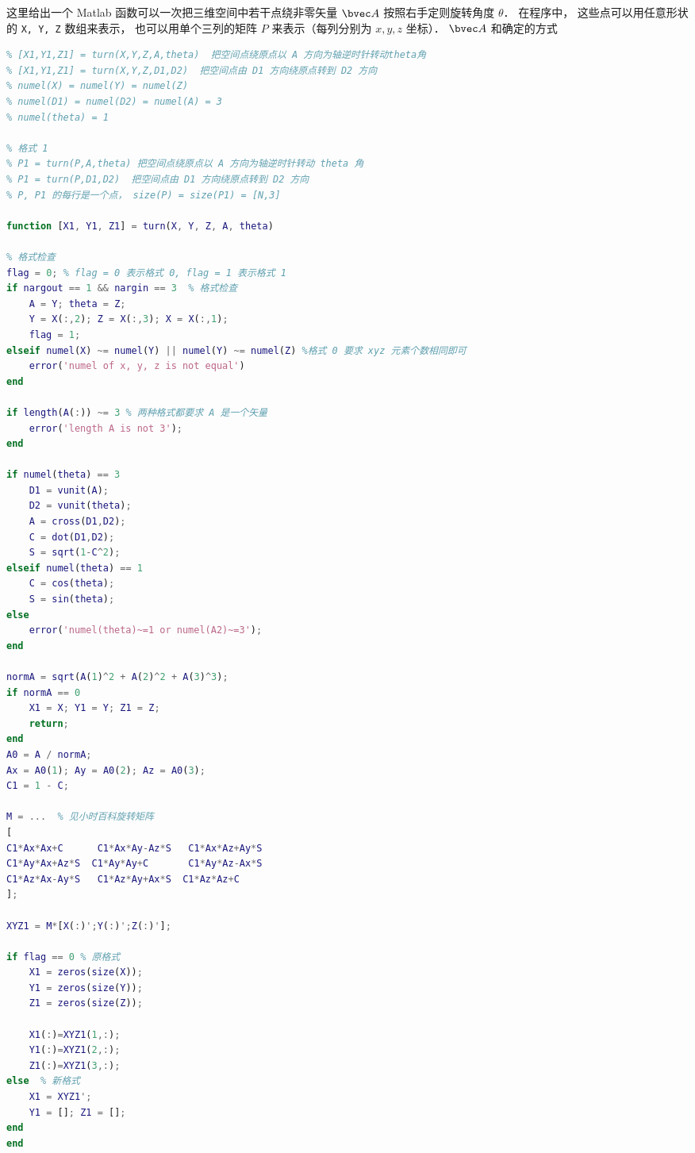 
\begin{issues}
\issueNeedCite
\end{issues}


这里给出一个 Matlab 函数可以一次把三维空间中若干点绕非零矢量 $\bvec A$ 按照右手定则旋转角度 $\theta$． 在程序中， 这些点可以用任意形状的 \verb|X, Y, Z| 数组来表示， 也可以用单个三列的矩阵 $P$ 来表示（每列分别为 $x, y, z$ 坐标）． $\bvec A$ 和确定的方式

\begin{lstlisting}[language=matlab]
% 格式 0
% [X1,Y1,Z1] = turn(X,Y,Z,A,theta)  把空间点绕原点以 A 方向为轴逆时针转动theta角
% [X1,Y1,Z1] = turn(X,Y,Z,D1,D2)  把空间点由 D1 方向绕原点转到 D2 方向
% numel(X) = numel(Y) = numel(Z)
% numel(D1) = numel(D2) = numel(A) = 3
% numel(theta) = 1

% 格式 1
% P1 = turn(P,A,theta) 把空间点绕原点以 A 方向为轴逆时针转动 theta 角
% P1 = turn(P,D1,D2)  把空间点由 D1 方向绕原点转到 D2 方向
% P, P1 的每行是一个点， size(P) = size(P1) = [N,3]

function [X1, Y1, Z1] = turn(X, Y, Z, A, theta)

% 格式检查
flag = 0; % flag = 0 表示格式 0, flag = 1 表示格式 1
if nargout == 1 && nargin == 3  % 格式检查
    A = Y; theta = Z;
    Y = X(:,2); Z = X(:,3); X = X(:,1);
    flag = 1;
elseif numel(X) ~= numel(Y) || numel(Y) ~= numel(Z) %格式 0 要求 xyz 元素个数相同即可
    error('numel of x, y, z is not equal')
end

if length(A(:)) ~= 3 % 两种格式都要求 A 是一个矢量
    error('length A is not 3');
end

if numel(theta) == 3
    D1 = vunit(A);
    D2 = vunit(theta);
    A = cross(D1,D2);
    C = dot(D1,D2);
    S = sqrt(1-C^2);
elseif numel(theta) == 1
    C = cos(theta);
    S = sin(theta);
else
    error('numel(theta)~=1 or numel(A2)~=3'); 
end

normA = sqrt(A(1)^2 + A(2)^2 + A(3)^3);
if normA == 0
    X1 = X; Y1 = Y; Z1 = Z;
    return;
end
A0 = A / normA;
Ax = A0(1); Ay = A0(2); Az = A0(3);
C1 = 1 - C;

M = ...  % 见小时百科旋转矩阵
[
C1*Ax*Ax+C      C1*Ax*Ay-Az*S   C1*Ax*Az+Ay*S
C1*Ay*Ax+Az*S  C1*Ay*Ay+C       C1*Ay*Az-Ax*S
C1*Az*Ax-Ay*S   C1*Az*Ay+Ax*S  C1*Az*Az+C 
];

XYZ1 = M*[X(:)';Y(:)';Z(:)'];

if flag == 0 % 原格式
    X1 = zeros(size(X));
    Y1 = zeros(size(Y));
    Z1 = zeros(size(Z));

    X1(:)=XYZ1(1,:);
    Y1(:)=XYZ1(2,:);
    Z1(:)=XYZ1(3,:);
else  % 新格式
    X1 = XYZ1';
    Y1 = []; Z1 = [];
end
end
\end{lstlisting}

